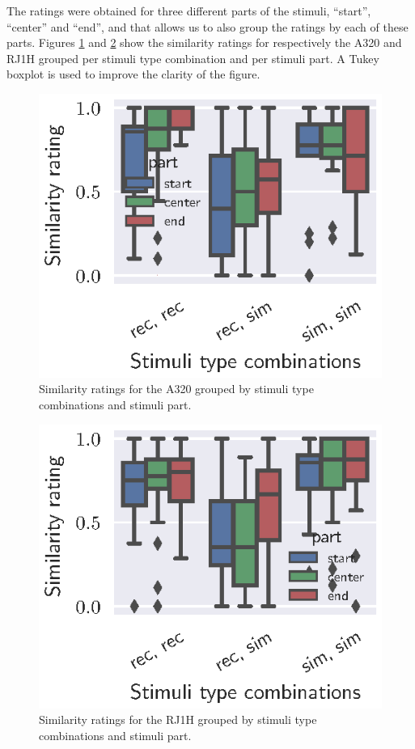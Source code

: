 The ratings were obtained for three different parts of the stimuli, ``start'',
``center'' and ``end'', and that allows us to also group the ratings by each of
these parts. Figures \ref{fig:ratings_part_A320} and \ref{fig:ratings_part_RJ1H}
show the similarity ratings for respectively the A320 and RJ1H grouped per
stimuli type combination and per stimuli part. A Tukey boxplot is used to
improve the clarity of the figure.

\begin{figure}[H]
  \centering
  \includegraphics[]{../figures/manual/auralisation-paper/figure5_ratings_part_A320}
  \caption{Similarity ratings for the A320 grouped by stimuli type combinations and stimuli part.}
  \label{fig:ratings_part_A320}
\end{figure}

\begin{figure}[H]
  \centering
  \includegraphics[]{../figures/manual/auralisation-paper/figure6_ratings_part_RJ1H}
  \caption{Similarity ratings for the RJ1H grouped by stimuli type combinations and stimuli part.}
  \label{fig:ratings_part_RJ1H}
\end{figure}


